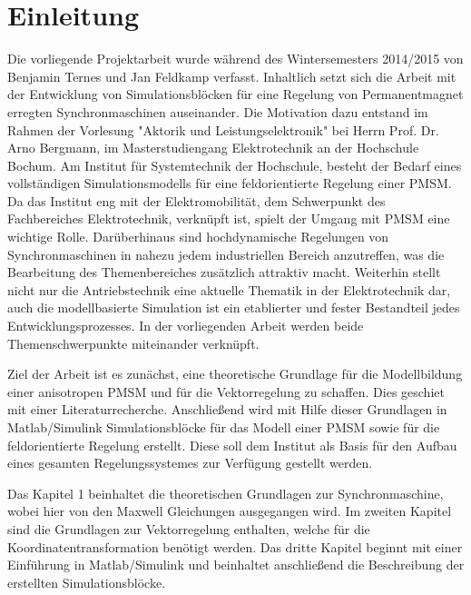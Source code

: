 
\chapter*{Einleitung}
\label{cha:einleitung}

Die vorliegende Projektarbeit wurde während des Wintersemesters 2014/2015 von Benjamin Ternes und Jan Feldkamp verfasst.
Inhaltlich setzt sich die Arbeit mit der Entwicklung von Simulationsblöcken für eine Regelung von Permanentmagnet erregten Synchronmaschinen auseinander.
Die Motivation dazu entstand im Rahmen der Vorlesung "Aktorik und Leistungselektronik" bei Herrn Prof. Dr. Arno Bergmann, im Masterstudiengang Elektrotechnik an der Hochschule Bochum.
Am Institut für Systemtechnik der Hochschule, besteht der Bedarf eines vollständigen Simulationsmodells für eine feldorientierte Regelung einer PMSM.
Da das Institut eng mit der Elektromobilität, dem Schwerpunkt des Fachbereiches Elektrotechnik, verknüpft ist, spielt der Umgang mit PMSM eine wichtige Rolle.
Darüberhinaus sind hochdynamische Regelungen von Synchronmaschinen in nahezu jedem industriellen Bereich anzutreffen, was die Bearbeitung des Themenbereiches zusätzlich attraktiv macht.
Weiterhin stellt nicht nur die Antriebstechnik eine aktuelle Thematik in der Elektrotechnik dar, auch die modellbasierte Simulation ist ein etablierter und fester Bestandteil jedes Entwicklungsprozesses.
In der vorliegenden Arbeit werden beide Themenschwerpunkte miteinander verknüpft.

Ziel der Arbeit ist es zunächst, eine theoretische Grundlage für die Modellbildung einer anisotropen PMSM und für die Vektorregelung zu schaffen.
Dies geschiet mit einer Literaturrecherche.
Anschließend wird mit Hilfe dieser Grundlagen in Matlab/Simulink Simulationsblöcke für das Modell einer PMSM sowie für die feldorientierte Regelung erstellt.
Diese soll dem Institut als Basis für den Aufbau eines gesamten Regelungssystemes zur Verfügung gestellt werden.

Das Kapitel 1 beinhaltet die theoretischen Grundlagen zur Synchronmaschine, wobei hier von den Maxwell Gleichungen ausgegangen wird.
Im zweiten Kapitel sind die Grundlagen zur Vektorregelung enthalten, welche für die Koordinatentransformation benötigt werden.
Das dritte Kapitel beginnt mit einer Einführung in Matlab/Simulink und beinhaltet anschließend die Beschreibung der erstellten Simulationsblöcke.


 

\cleardoublepage
